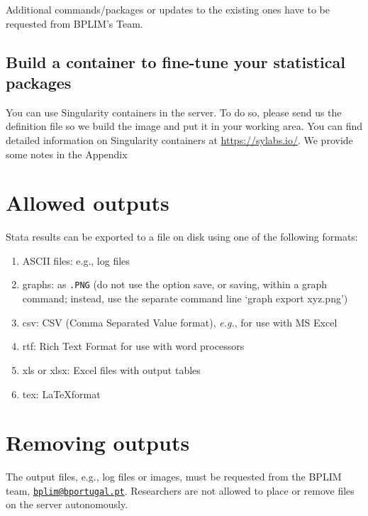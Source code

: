 \documentclass[
  11pt,
  a4paper,
]{article}
\begin{document}
Additional commands/packages or updates to the existing ones have to be
requested from BPLIM's Team.

\hypertarget{build-a-container-to-fine-tune-your-statistical-packages}{%
\subsection{Build a container to fine-tune your statistical
packages}\label{build-a-container-to-fine-tune-your-statistical-packages}}

You can use Singularity containers in the server. To do so, please send
us the definition file so we build the image and put it in your working
area. You can find detailed information on Singularity containers at
\url{https://sylabs.io/}. We provide some notes in the Appendix

\hypertarget{allowed-outputs}{%
\section{Allowed outputs}\label{allowed-outputs}}

Stata results can be exported to a file on disk using one of the
following formats:

\begin{enumerate}
\def\labelenumi{\arabic{enumi}.}
\item
  ASCII files: e.g., log files
\item
  graphs: as \texttt{.PNG} (do not use the option save, or saving,
  within a graph command; instead, use the separate command line `graph
  export xyz.png')
\item
  csv: CSV (Comma Separated Value format), \emph{e.g.}, for use with MS
  Excel
\item
  rtf: Rich Text Format for use with word processors
\item
  xls or xlsx: Excel files with output tables
\item
  tex: \LaTeX format
\end{enumerate}

\hypertarget{removing-outputs}{%
\section{Removing outputs}\label{removing-outputs}}

The output files, e.g., log files or images, must be requested from the
BPLIM team,
\href{mailto:bplim@bportugal.pt}{\nolinkurl{bplim@bportugal.pt}}.
Researchers are not allowed to place or remove files on the server
autonomously.
\end{document}
